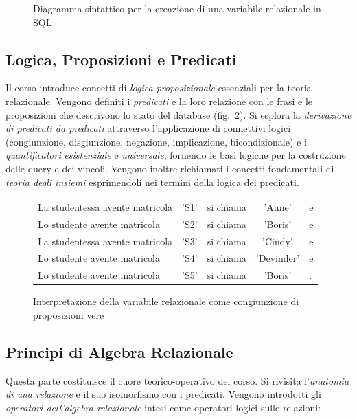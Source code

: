 \documentclass[withtimes]{easychair}
\theoremstyle{definition}
\begin{document}
\begin{figure}[hbt]
    \centering
    
    \caption{Diagramma sintattico per la creazione di una variabile relazionale in SQL}\label{fig:sql-syntax}
\end{figure}


\subsection{Logica, Proposizioni e Predicati}\label{logica-proposizioni-e-predicati}

Il corso introduce concetti di \emph{logica proposizionale} essenziali per la teoria relazionale. Vengono definiti i \emph{predicati} e la loro relazione con le frasi e le proposizioni che descrivono lo stato del database (fig.~\ref{fig:proposizioni}). Si esplora la \emph{derivazione di predicati da predicati} attraverso l'applicazione di connettivi logici (congiunzione, disgiunzione, negazione, implicazione, bicondizionale) e i \emph{quantificatori} \emph{esistenziale} e \emph{universale}, fornendo le basi logiche per la costruzione delle query e dei vincoli. Vengono inoltre richiamati i concetti fondamentali di \emph{teoria degli insiemi} esprimendoli nei termini della logica dei predicati.


\begin{figure}[htb]
\centering
\begin{tabular}{lclcl}
La studentessa avente matricola & 'S1' & si chiama & 'Anne' & e \\
Lo studente avente matricola & 'S2' & si chiama & 	'Boris'& e \\
La studentessa avente matricola & 'S3' & si chiama & 'Cindy'& e \\
Lo studente avente matricola & 'S4' & si chiama & 'Devinder'& e \\
Lo studente avente matricola & 'S5' & si chiama & 'Boris'&.
\end{tabular}
\caption{Interpretazione della variabile relazionale come congiunzione di proposizioni vere}\label{fig:proposizioni}
\end{figure}

\subsection{Principi di Algebra Relazionale}\label{principi-di-algebra-relazionale}

Questa parte costituisce il cuore teorico-operativo del corso. Si rivisita l'\emph{anatomia di una relazione} e il suo isomorfismo con i predicati. Vengono introdotti gli \emph{operatori dell'algebra relazionale} intesi come operatori logici sulle relazioni:
\end{document}
